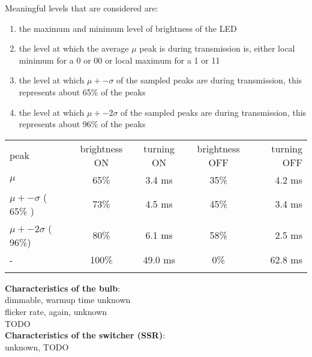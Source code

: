 Meaningful levels that are considered are:
\begin{enumerate}
\item the maximum and minimum level of brightness of the LED
\item the level at which the average $\mu$ peak is during transmission is, either local minimum for a 0 or 00 or local maximum for a 1 or 11
\item the level at which $\mu +- \sigma$ of the sampled peaks are during transmission, this represents about 65\% of the peaks
\item the level at which $\mu +- 2\sigma$ of the sampled peaks are during transmission, this represents about 96\% of the peaks
\end{enumerate}

\begin{tabular}{l c c c r}
\hline
peak & brightness ON & turning ON & brightness OFF & turning OFF \\
$\mu$ & 65\% & 3.4 ms & 35\% & 4.2 ms \\
$\mu +- \sigma$ ( 65\% )& 73\% & 4.5 ms & 45\% &  3.4 ms \\
$\mu +- 2 \sigma$ ( 96\%) & 80\% & 6.1 ms & 58\% & 2.5 ms \\
 - & 100\% & 49.0 ms & 0\% & 62.8 ms \\ 
\hline
\label{table:warmup}
\end{tabular}
\newline \newline \newline
\textbf{Characteristics of the bulb}:\\ 
dimmable, warmup time unknown\\
flicker rate, again, unknown\\
TODO\\
\newline
\textbf{Characteristics of the switcher (SSR)}:\\
unknown, TODO\\

